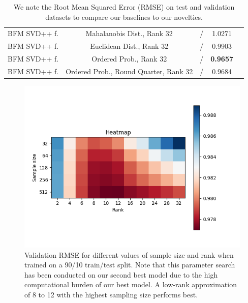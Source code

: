 \documentclass[10pt,conference,compsocconf]{IEEEtran}
\begin{document}
\begin{table}
{\begin{tabular}{|| c | c | c | c | c ||}
                BFM SVD++ f.         & Mahalanobis Dist., Rank 32            & /                       & 1.0271                 &                         \\
                BFM SVD++ f.         & Euclidean Dist., Rank 32              & /                       & 0.9903                 &                         \\
                BFM SVD++ f.         & Ordered Prob., Rank 32                & /                       & \textbf{ 0.9657 }      &                         \\
                BFM SVD++ f.         & Ordered Prob., Round Quarter, Rank 32 & /                       & 0.9684                 &                         \\
                \hline
            \end{tabular}
        }
        \caption{We note the Root Mean Squared Error (RMSE) on test and validation datasets to compare our baselines to our novelties.}
        \label{tab:ablation}
    \end{table}


    \begin{figure}
        \includegraphics[width=\columnwidth]{figures/heatmap.png}
        \caption{Validation RMSE for different values of sample size and rank when trained on a 90/10 train/test split. Note that this parameter search has been conducted on our second best model due to the high computational burden of our best model.
        A low-rank approximation of 8 to 12 with the highest sampling size performs best.}
        \label{fig:Heatmap}
    \end{figure}
\end{document}
